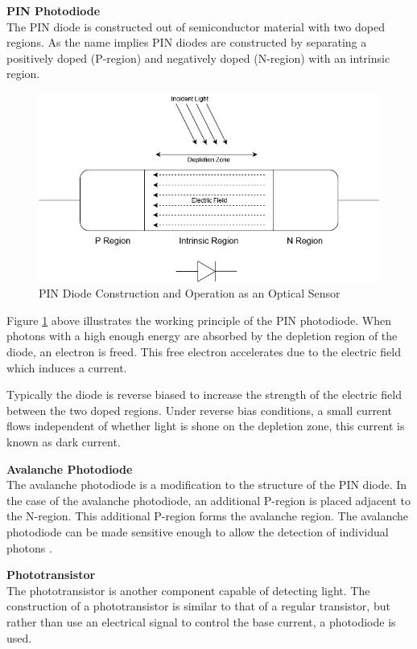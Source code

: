 \textbf{PIN Photodiode}\\
The PIN diode is constructed out of semiconductor material with two doped regions. As the name implies PIN diodes are constructed by separating a positively doped (P-region) and negatively doped (N-region) with an intrinsic region.

\begin{figure}[H]
	\centering
	\includegraphics[width=0.8\linewidth]{figures/litreview/pin_diode_diagram.png}
	\caption{PIN Diode Construction and Operation as an Optical Sensor}
	\label{fig:pin_diode_diagram}
\end{figure}

Figure \ref{fig:pin_diode_diagram} above illustrates the working principle of the PIN photodiode.
When photons with a high enough energy are absorbed by the depletion region of the diode, an electron is freed. This free electron accelerates due to the electric field which induces a current.

Typically the diode is reverse biased to increase the strength of the electric field between the two doped regions. Under reverse bias conditions, a small current flows independent of whether light is shone on the depletion zone, this current is known as dark current.

\textbf{Avalanche Photodiode}\\
The avalanche photodiode is a modification to the structure of the PIN diode. In the case of the avalanche photodiode, an additional P-region is placed adjacent to the N-region. This additional P-region forms the avalanche region. The avalanche photodiode can be made sensitive enough to allow the detection of individual photons \cite{Perenzoni2018}.

\textbf{Phototransistor}\\
The phototransistor is another component capable of detecting light. The construction of a phototransistor is similar to that of a regular transistor, but rather than use an electrical signal to control the base current, a photodiode is used.

